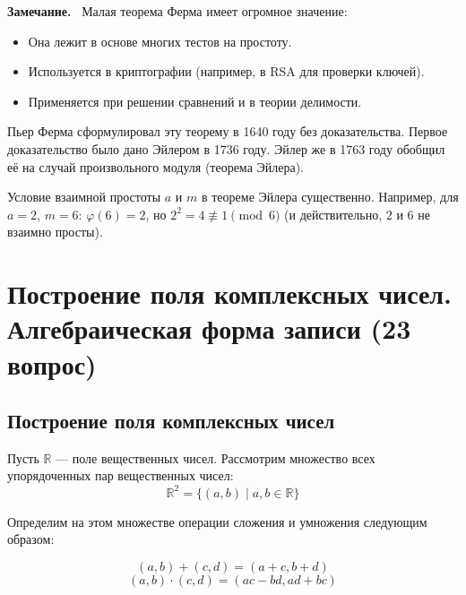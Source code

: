 \documentclass[a4paper,12pt]{article}
\newcommand{\myremark}{\textbf{Замечание.}\ }
\theoremstyle{definition}
\theoremstyle{plain}
\theoremstyle{remark}
\begin{document}
	\myremark
	Малая теорема Ферма имеет огромное значение:
	\begin{itemize}
		\item Она лежит в основе многих тестов на простоту.
		\item Используется в криптографии (например, в RSA для проверки ключей).
		\item Применяется при решении сравнений и в теории делимости.
	\end{itemize}
	
	\begin{tcolorbox}[colback=purple!5, colframe=purple!50!black, title=Заметочка: История]
		Пьер Ферма сформулировал эту теорему в 1640 году без доказательства. Первое доказательство было дано Эйлером в 1736 году. Эйлер же в 1763 году обобщил её на случай произвольного модуля (теорема Эйлера).
	\end{tcolorbox}
	
	\begin{tcolorbox}[colback=yellow!5, colframe=orange!60!black, title=Важное замечание]
		Условие взаимной простоты $a$ и $m$ в теореме Эйлера существенно. Например, для $a=2$, $m=6$: $\varphi(6)=2$, но $2^2=4 \not\equiv 1 \pmod{6}$ (и действительно, $2$ и $6$ не взаимно просты).
	\end{tcolorbox}
	
	
	
	
	
	
	
	\newpage
	\section{Построение поля комплексных чисел. Алгебраическая форма записи (23 вопрос)}
	
	\subsection{Построение поля комплексных чисел}
	
	\noindent Пусть $\mathbb{R}$ — поле вещественных чисел. Рассмотрим множество всех упорядоченных пар вещественных чисел:
	\[
	\mathbb{R}^2 = \{(a, b) \mid a, b \in \mathbb{R}\}
	\]
	
	Определим на этом множестве операции сложения и умножения следующим образом:
	
	\begin{tcolorbox}[colback=blue!5, colframe=blue!40!black, title=Определение операций]
		\[
		(a, b) + (c, d) = (a + c, b + d)
		\]
		\[
		(a, b) \cdot (c, d) = (ac - bd, ad + bc)
		\]
	\end{tcolorbox}
	
\end{document}
